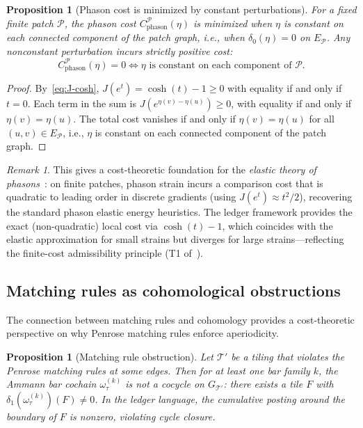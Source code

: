 \documentclass[12pt]{article}
\newtheorem{proposition}[theorem]{Proposition}
\theoremstyle{definition}
\theoremstyle{remark}
\newtheorem{remark}[theorem]{Remark}
\begin{document}
\begin{proposition}[Phason cost is minimized by constant perturbations]
\label{prop:phason-min}
For a fixed finite patch $\mathcal{P}$, the phason cost $C^{\mathcal{P}}_{\text{phason}}(\eta)$ is minimized when $\eta$ is constant on each connected component of the patch graph, i.e., when $\delta_0(\eta) = 0$ on $E_{\mathcal{P}}$. Any nonconstant perturbation incurs strictly positive cost:
\[
C^{\mathcal{P}}_{\text{phason}}(\eta) = 0 \iff \eta \text{ is constant on each component of }\mathcal{P}.
\]
\end{proposition}

\begin{proof}
By~\eqref{eq:J-cosh}, $J(e^t) = \cosh(t) - 1 \geq 0$ with equality if and only if $t = 0$. Each term in the sum is $J(e^{\eta(v) - \eta(u)}) \geq 0$, with equality if and only if $\eta(v) = \eta(u)$. The total cost vanishes if and only if $\eta(v) = \eta(u)$ for all $(u,v) \in E_{\mathcal{P}}$, i.e., $\eta$ is constant on each connected component of the patch graph.
\end{proof}

\begin{remark}
This gives a cost-theoretic foundation for the \emph{elastic theory of phasons}~\cite{Levine1985}: on finite patches, phason strain incurs a comparison cost that is quadratic to leading order in discrete gradients (using $J(e^t) \approx t^2/2$), recovering the standard phason elastic energy heuristics. The ledger framework provides the exact (non-quadratic) local cost via $\cosh(t) - 1$, which coincides with the elastic approximation for small strains but diverges for large strains---reflecting the finite-cost admissibility principle (T1 of~\cite{PardoGuerraEtAl2026}).
\end{remark}

\subsection{Matching rules as cohomological obstructions}

The connection between matching rules and cohomology provides a cost-theoretic perspective on why Penrose matching rules enforce aperiodicity.

\begin{proposition}[Matching rule obstruction]
\label{prop:obstruction}
Let $\mathcal{T}'$ be a tiling that violates the Penrose matching rules at some edges. Then for at least one bar family $k$, the Ammann bar cochain $\omega_\tau^{(k)}$ is \emph{not} a cocycle on $G_{\mathcal{T}'}$: there exists a tile $F$ with $\delta_1(\omega_\tau^{(k)})(F) \neq 0$. In the ledger language, the cumulative posting around the boundary of $F$ is nonzero, violating cycle closure.
\end{proposition}
\end{document}
